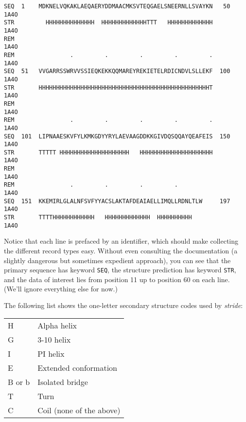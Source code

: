 \begin{lstlisting}
SEQ  1    MDKNELVQKAKLAEQAERYDDMAACMKSVTEQGAELSNEERNLLSVAYKN   50          1A4O
STR         HHHHHHHHHHHHHH  HHHHHHHHHHHHHTTT   HHHHHHHHHHHHH               1A4O
REM                                                                        1A4O
REM                .         .         .         .         .               1A4O
SEQ  51   VVGARRSSWRVVSSIEQKEKKQQMAREYREKIETELRDICNDVLSLLEKF  100          1A4O
STR       HHHHHHHHHHHHHHHHHHHHHHHHHHHHHHHHHHHHHHHHHHHHHHHHHT               1A4O
REM                                                                        1A4O
REM                .         .         .         .         .               1A4O
SEQ  101  LIPNAAESKVFYLKMKGDYYRYLAEVAAGDDKKGIVDQSQQAYQEAFEIS  150          1A4O
STR       TTTTT HHHHHHHHHHHHHHHHHHHH   HHHHHHHHHHHHHHHHHHHHH               1A4O
REM                                                                        1A4O
REM                .         .         .         .                         1A4O
SEQ  151  KKEMIRLGLALNFSVFYYACSLAKTAFDEAIAELLIMQLLRDNLTLW     197          1A4O
STR       TTTTHHHHHHHHHHHH   HHHHHHHHHHHHH  HHHHHHHHHH                     1A4O
\end{lstlisting}

Notice that each line is prefaced by an identifier, which should make collecting the different record types easy. Without even consulting the documentation (a slightly dangerous but sometimes expedient approach), you can see that the primary sequence has keyword \verb|SEQ|, the structure prediction has keyword \verb|STR|, and the data of interest lies from position 11 up to position 60 on each line. (We'll ignore everything else for now.)

The following list shows the one-letter secondary structure codes used by \textit{stride}: 

\begin{table}[!htbp]
  \begin{center}
  \begin{tabu} to 0.5\linewidth {X[1,l]X[2,l]}
  \toprule
  H & Alpha helix\\
  G & 3-10 helix\\
  I & PI helix\\
  E & Extended conformation\\
  B or b& Isolated bridge\\
  T & Turn\\
  C & Coil (none of the above)\\
  \bottomrule
  \end{tabu}
  \end{center}
\end{table}

